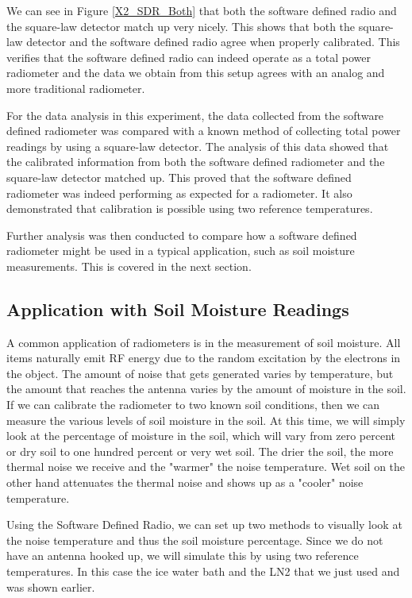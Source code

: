 {We can see in Figure \ref{X2_SDR_Both} that both the software defined radio and the square-law detector match up very nicely.  This shows that both the square-law detector and the software defined radio agree when properly calibrated.  This verifies that the software defined radio can indeed operate as a total power radiometer and the data we obtain from this setup agrees with an analog and more traditional radiometer.

For the data analysis in this experiment, the data collected from the software defined radiometer was compared with a known method of collecting total power readings by using a square-law detector.  The analysis of this data showed that the calibrated information from both the software defined radiometer and the square-law detector matched up.  This proved that the software defined radiometer was indeed performing as expected for a radiometer.  It also demonstrated that calibration is possible using two reference temperatures.  

Further analysis was then conducted to compare how a software defined radiometer might be used in a typical application, such as soil moisture measurements.  This is covered in the next section.

\subsection{Application with Soil Moisture Readings}
A common application of radiometers is in the measurement of soil moisture.  All items naturally emit RF energy due to the random excitation by the electrons in the object.  The amount of noise that gets generated varies by temperature, but the amount that reaches the antenna varies by the amount of moisture in the soil.  If we can calibrate the radiometer to two known soil conditions, then we can measure the various levels of soil moisture in the soil.  At this time, we will simply look at the percentage of moisture in the soil, which will vary from zero percent or dry soil to one hundred percent or very wet soil.  The drier the soil, the more thermal noise we receive and the "warmer" the noise temperature.  Wet soil on the other hand attenuates the thermal noise and shows up as a "cooler" noise temperature.  

Using the Software Defined Radio, we can set up two methods to visually look at the noise temperature and thus the soil moisture percentage.  Since we do not have an antenna hooked up, we will simulate this by using two reference temperatures.  In this case the ice water bath and the LN2 that we just used and was shown earlier.  

}

